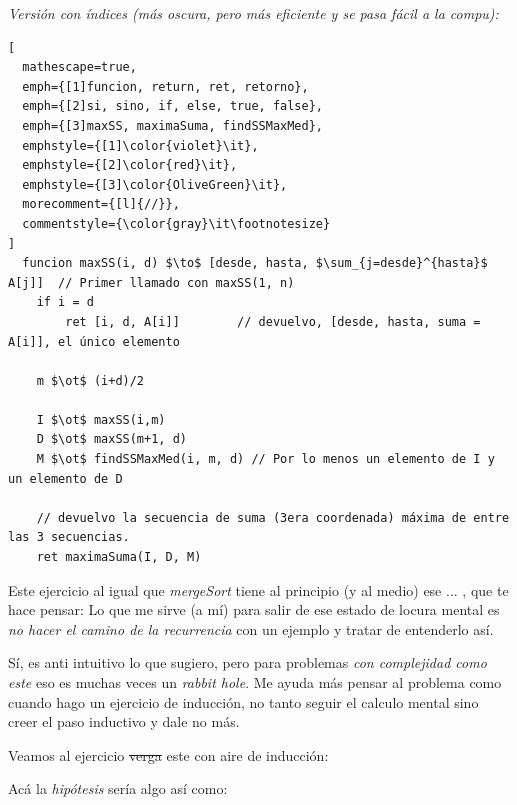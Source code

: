 \bigskip

\textit{Versión con índices (más oscura, pero más eficiente y se pasa fácil a la compu):}
\begin{tcolorbox}
  \begin{lstlisting}[
  mathescape=true,
  emph={[1]funcion, return, ret, retorno},
  emph={[2]si, sino, if, else, true, false},
  emph={[3]maxSS, maximaSuma, findSSMaxMed},
  emphstyle={[1]\color{violet}\it},
  emphstyle={[2]\color{red}\it},
  emphstyle={[3]\color{OliveGreen}\it},
  morecomment={[l]{//}},
  commentstyle={\color{gray}\it\footnotesize}
]
  funcion maxSS(i, d) $\to$ [desde, hasta, $\sum_{j=desde}^{hasta}$ A[j]]  // Primer llamado con maxSS(1, n)
    if i = d
        ret [i, d, A[i]]        // devuelvo, [desde, hasta, suma = A[i]], el único elemento

    m $\ot$ (i+d)/2

    I $\ot$ maxSS(i,m)
    D $\ot$ maxSS(m+1, d)
    M $\ot$ findSSMaxMed(i, m, d) // Por lo menos un elemento de I y un elemento de D

    // devuelvo la secuencia de suma (3era coordenada) máxima de entre las 3 secuencias.
    ret maximaSuma(I, D, M)\end{lstlisting}
\end{tcolorbox}

Este ejercicio al igual que \textit{mergeSort} tiene al principio (y al medio) ese ... \textit{}, que te hace pensar:
Lo que me sirve (a mí) para salir de ese estado de locura mental es \textit{no hacer el camino de la recurrencia} con un ejemplo y tratar de entenderlo así.

Sí, es anti intuitivo lo que sugiero, pero para problemas \textit{con complejidad como este} eso es muchas veces un \textit{rabbit hole}.
Me ayuda más pensar al problema como cuando hago un ejercicio de inducción, no tanto seguir el calculo mental sino creer el paso inductivo y dale no más.

Veamos al ejercicio \sout{verga} este con aire de inducción:

Acá la \textit{hipótesis} sería algo así como:

